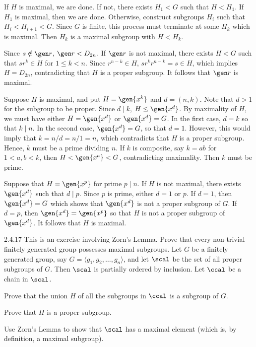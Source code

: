 \begin{solenum}[spsol]
    \item If $H$ is maximal, we are done.
	If not, there exists $H_1 < G$ such that $H < H_1$.
	If $H_1$ is maximal, then we are done.
	Otherwise, construct subgroups $H_i$ such that $H_i < H_{i + 1} < G$.
	Since $G$ is finite, this process must terminate at some $H_k$ which is maximal.
	Then $H_k$ is a maximal subgroup with $H < H_k$.
    \item Since $s \notin \gen r$, $\gen r < D_{2n}$.
	If $\gen r$ is not maximal, there exists $H < G$ such that $sr^k \in H$ for $1 \leq k < n$.
	Since $r^{n - k} \in H$, $sr^kr^{n - k} = s \in H$, which implies $H = D_{2n}$, contradicting that $H$ is a proper subgroup.
	It follows that $\gen r$ is maximal.
    \item \rightimp Suppose $H$ is maximal, and put $H = \gen{x^k}$ and $d = (n, k)$.
	Note that $d > 1$ for the subgroup to be proper.
	Since $d \mid k$, $H \leq \gen{x^d}$.
	By maximality of $H$, we must have either $H = \gen{x^d}$ or $\gen{x^d} = G$.
	In the first case, $d = k$ so that $k \mid n$.
	In the second case, $\gen{x^d} = G$, so that $d = 1$.
	However, this would imply that $k = n/d = n/1 = n$, which contradicts that $H$ is a proper subgroup.
	Hence, $k$ must be a prime dividing $n$.
	If $k$ is composite, say $k = ab$ for $1 < a, b < k$, then $H < \gen{x^a} < G$, contradicting maximality.
	Then $k$ must be prime.

    \leftimp Suppose that $H = \gen{x^p}$ for prime $p \mid n$.
	If $H$ is not maximal, there exists $\gen{x^d}$ such that $d \mid p$.
	Since $p$ is prime, either $d = 1$ or $p$.
	If $d = 1$, then $\gen{x^d} = G$ which shows that $\gen{x^d}$ is not a proper subgroup of $G$.
	If $d = p$, then $\gen{x^d} = \gen{x^p}$ so that $H$ is not a proper subgroup of $\gen{x^d}$.
	It follows that $H$ is maximal.
\end{solenum}

\begin{spex}{2.4.17}
    This is an exercise involving Zorn's Lemma.
	Prove that every non-trivial finitely generated group possesses maximal subgroups.
	Let $G$ be a finitely generated group, say $G=\langle g_1, g_2, \ldots, g_n\rangle$, and let $\scal$ be the set of all proper subgroups of $G$.
	Then $\scal$ is partially ordered by inclusion.
	Let $\ccal$ be a chain in $\scal$.
    \begin{subexercises}
        \item Prove that the union $H$ of all the subgroups in $\ccal$ is a subgroup of $G$.
        \item Prove that $H$ is a proper subgroup.  
        \item Use Zorn's Lemma to show that $\scal$ has a maximal element (which is, by definition, a maximal subgroup).
    \end{subexercises}
\end{spex}

